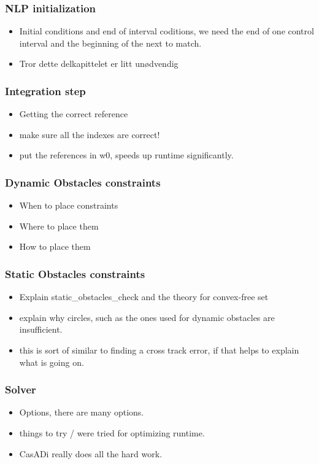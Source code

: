 \subsubsection{NLP initialization}
\begin{itemize}
    \item Initial conditions and end of interval coditions, we need the end of one control interval and the beginning of the next to match.
    \item Tror dette delkapittelet er litt unødvendig
\end{itemize}

\subsubsection{Integration step}
\begin{itemize}
    \item Getting the correct reference
    \item make sure all the indexes are correct!
    \item put the references in w0, speeds up runtime significantly.
\end{itemize}

\subsubsection{Dynamic Obstacles constraints}
\begin{itemize}
    \item When to place constraints
    \item Where to place them
    \item How to place them
\end{itemize}

\subsubsection{Static Obstacles constraints}
\begin{itemize}
    \item Explain static\_obstacles\_check and the theory for convex-free set
    \item explain why circles, such as the ones used for dynamic obstacles are insufficient.
    \item this is sort of similar to finding a cross track error, if that helps to explain what is going on.
\end{itemize}

\subsubsection{Solver}
\begin{itemize}
    \item Options, there are many options.
    \item things to try / were tried for optimizing runtime.
    \item CasADi really does all the hard work.
\end{itemize}

